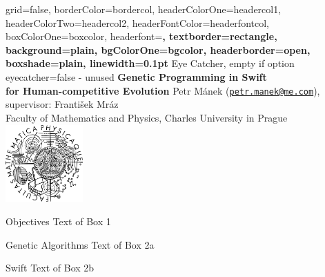 \documentclass[a0paper,portrait]{baposter}
\begin{document}

\begin{poster}{
	grid=false,
	borderColor=bordercol,
	headerColorOne=headercol1,
	headerColorTwo=headercol2,
	headerFontColor=headerfontcol,
	boxColorOne=boxcolor,
	headerfont=\Large\bf{}\selectfont,
	textborder=rectangle,
	background=plain,
	bgColorOne=bgcolor,
	headerborder=open,
	boxshade=plain,
	linewidth=0.1pt
}
{
	Eye Catcher, empty if option eyecatcher=false - unused
}
{\sf\bf
	Genetic Programming in Swift\\
	for Human-competitive Evolution
}
{
	\vspace{1em} Petr Mánek (\href{mailto:petr.manek@me.com}{\texttt{petr.manek@me.com}}), supervisor: František Mráz\\
	{\smaller Faculty of Mathematics and Physics, Charles University in Prague}
}
{
	\includegraphics[width=8em,height=8em]{logo}
}

\begin{posterbox}[name=objectives,column=0]{Objectives}
Text of Box 1
\end{posterbox}

\begin{posterbox}[name=intro-ga,column=0,below=objectives]{Genetic Algorithms}
Text of Box 2a
\end{posterbox}

\begin{posterbox}[name=intro-swift,column=0,below=intro-ga]{Swift}
Text of Box 2b
\end{posterbox}


\end{poster}
\end{document}
